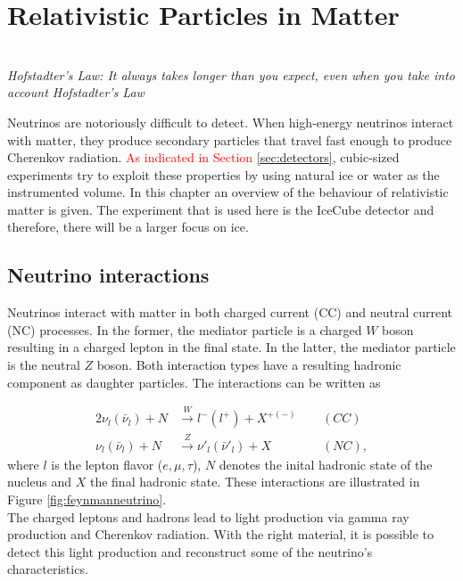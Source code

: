 \chapter{Relativistic Particles in Matter}
\label{ch:cherenkov}
\begin{flushright}
\textit{\\Hofstadter's Law: It always takes longer than you expect, even when you take into account Hofstadter's Law\\}
\end{flushright}

\noindent Neutrinos are notoriously difficult to detect. When high-energy neutrinos interact with matter, they produce secondary particles that travel fast enough to produce Cherenkov radiation. \textcolor{red}{As indicated in Section \ref{sec:detectors}}, cubic-sized experiments try to exploit these properties by using natural ice or water as the instrumented volume. In this chapter an overview of the behaviour of relativistic matter is given. The experiment that is used here is the IceCube detector and therefore, there will be a larger focus on ice.

\section{Neutrino interactions}
\label{sec:neutrinointeractions}
Neutrinos interact with matter in both charged current (CC) and neutral current (NC) processes. In the former, the mediator particle is a charged $W$ boson resulting in a charged lepton in the final state. In the latter, the mediator particle is the neutral $Z$ boson. Both interaction types have a resulting hadronic component as daughter particles. The interactions can be written as

\begin{alignat}{2}
\nu_l \left(\bar{\nu}_l\right) + N &\xrightarrow{W} l^- \left(l^+\right) + X^{+\left(-\right)} \ \ && \left(CC\right)\\
\nu_l \left(\bar{\nu}_l\right) + N &\xrightarrow{Z} \nu'_l \left(\bar{\nu}'_l\right) + X && \left(NC\right),
\end{alignat}
where $l$ is the lepton flavor ($e,\mu,\tau$), $N$ denotes the inital hadronic state of the nucleus and $X$ the final hadronic state. These interactions are illustrated in Figure \ref{fig:feynmanneutrino}.\\
\newline
The charged leptons and hadrons lead to light production via gamma ray production and Cherenkov radiation. With the right material, it is possible to detect this light production and reconstruct some of the neutrino's characteristics.

